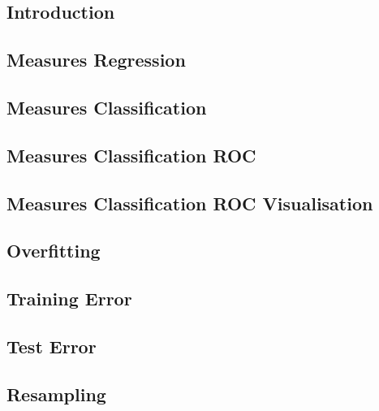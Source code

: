 

\subsection{Introduction}


\subsection{Measures Regression}


\subsection{Measures Classification}


\subsection{Measures Classification ROC}


\subsection{Measures Classification ROC Visualisation}


\subsection{Overfitting}


\subsection{Training Error}


\subsection{Test Error}


\subsection{Resampling}

